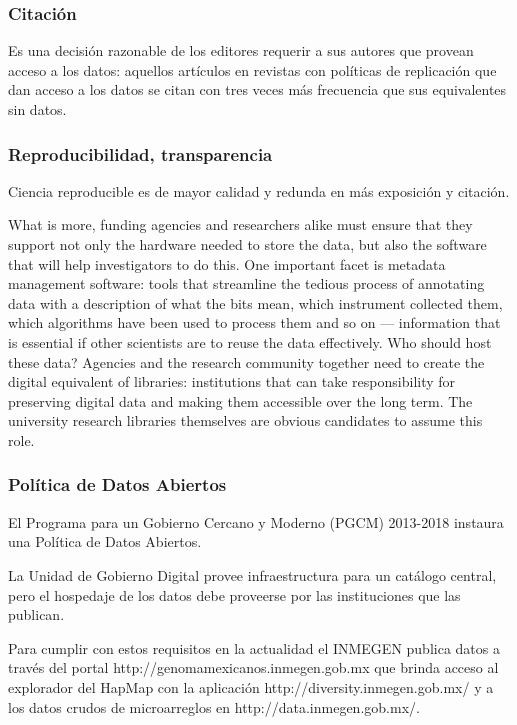 \documentclass[
10pt, %
letterpaper, %
oneside, %
headinclude,footinclude, %
BCOR5mm, %
]{scrartcl}
\begin{document}
\subsubsection{Citación}
Es una decisión razonable de los editores requerir a sus autores
que provean acceso a los datos: aquellos artículos en revistas con
políticas de replicación que dan acceso a los datos se citan con tres
veces más frecuencia que sus equivalentes sin datos.\cite{walport_sharing_2011}


\subsubsection{Reproducibilidad, transparencia}
Ciencia reproducible es de mayor calidad y redunda en más exposición y
citación. \cite{piwowar_sharing_2007} \cite{ioannidis}



What is more, funding agencies and researchers alike must ensure that
they support not only the hardware needed to store the data, but also
the software that will help investigators to do this. One important
facet is metadata management software: tools that streamline the
tedious process of annotating data with a description of what the bits
mean, which instrument collected them, which algorithms have been used
to process them and so on — information that is essential if other
scientists are to reuse the data effectively. Who should host these
data? Agencies and the research community together need to create the
digital equivalent of libraries: institutions that can take
responsibility for preserving digital data and making them accessible
over the long term. The university research libraries themselves are
obvious candidates to assume this role.

\subsubsection{Política de Datos Abiertos}
El Programa para un Gobierno Cercano y Moderno (PGCM) 2013-2018
instaura una Política de Datos Abiertos.

La Unidad de Gobierno Digital provee infraestructura para un catálogo
central, pero el hospedaje de los datos debe proveerse por las
instituciones que las publican.

Para cumplir con estos requisitos en la actualidad el INMEGEN publica
datos a través del portal http://genomamexicanos.inmegen.gob.mx que
brinda acceso al explorador del HapMap con la aplicación
http://diversity.inmegen.gob.mx/ y a los datos crudos de microarreglos
en http://data.inmegen.gob.mx/.
\end{document}
